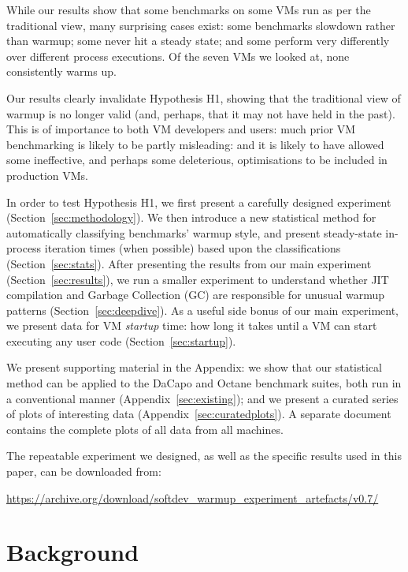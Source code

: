 \documentclass[preprint,numbers,10pt]{sigplanconf}
\begin{document}
While our results show that some benchmarks on some VMs run as per the traditional
view, many surprising cases exist: some benchmarks slowdown rather than
warmup; some never hit a steady state; and some perform very differently over
different process executions. Of the seven
VMs we looked at, none consistently warms up.

Our results clearly invalidate Hypothesis H1, showing that the traditional
view of warmup is no longer valid (and, perhaps, that it may not have held in
the past). This is of importance to both VM developers and users:
much prior VM benchmarking is likely to be partly misleading: and it is
likely to have allowed some ineffective, and perhaps some deleterious,
optimisations to be included in production VMs.

\vspace{10pt}

\noindent In order to test Hypothesis H1, we first present a carefully designed
experiment (Section~\ref{sec:methodology}). We then introduce a new
statistical method for automatically classifying benchmarks' warmup style, and present steady-state
in-process iteration times (when possible) based upon the classifications
(Section~\ref{sec:stats}). After presenting the results from our
main experiment (Section~\ref{sec:results}), we run a smaller experiment to understand whether JIT
compilation and Garbage Collection (GC) are responsible for unusual warmup patterns
(Section~\ref{sec:deepdive}). As a useful side bonus of our main experiment,
we present data for VM \emph{startup} time: how long it takes until a VM can
start executing any user code (Section~\ref{sec:startup}).

We present supporting material in the Appendix: we show that our
statistical method can be applied to the DaCapo and Octane benchmark suites,
both run in a conventional manner (Appendix~\ref{sec:existing}); and we present a curated
series of plots of interesting data (Appendix~\ref{sec:curatedplots}). A
separate document contains the complete plots of all data from all machines.

The repeatable experiment we designed, as well as the specific results used
in this paper, can be downloaded from:
\vspace{-.5em}
\begin{center}
\url{https://archive.org/download/softdev_warmup_experiment_artefacts/v0.7/}
\end{center}


\section{Background}
\label{sec:warmup}
\end{document}

